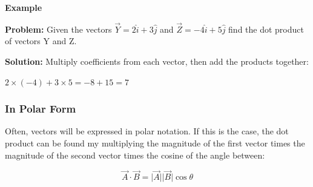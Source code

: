 		\begin{mdframed}[backgroundcolor=blue!10!white]
			\begin{center}
				\textbf{Example \thesubsection}	\label{example:dotproduct}
				
				
			\end{center}
		
		\textbf{Problem:} Given the vectors $ \vec{Y} = 2 \hat{i} + 3 \hat{j} $ and $\vec{Z} = -4 \hat{i} + 5 \hat{j}$ find the dot product of vectors Y and Z. 
		
		\vspace{.1in}
		
		\textbf{Solution:} Multiply coefficients from each vector, then add the products together:
		\begin{center}
			$2\times(-4) + 3\times 5 = -8 + 15 = \boxed{7}$ 
		\end{center}
		
		
		\end{mdframed}
	\subsubsection{In Polar Form}
	Often, vectors will be expressed in polar notation.  If this is the case, the dot product can be found my multiplying the magnitude of the first vector times the magnitude of the second vector times the cosine of the angle between:
	
	
	\begin{mdframed}[backgroundcolor=orange!20!white]
		\begin{equation}
			\label{equation:dotproduct}
		\vec{A} \cdot \vec{B} = \lvert \vec{A} \rvert  \lvert \vec{B} \rvert \cos{\theta}
		\end{equation}
		
	\end{mdframed}
	
	
	\vspace{0.1in}
	
